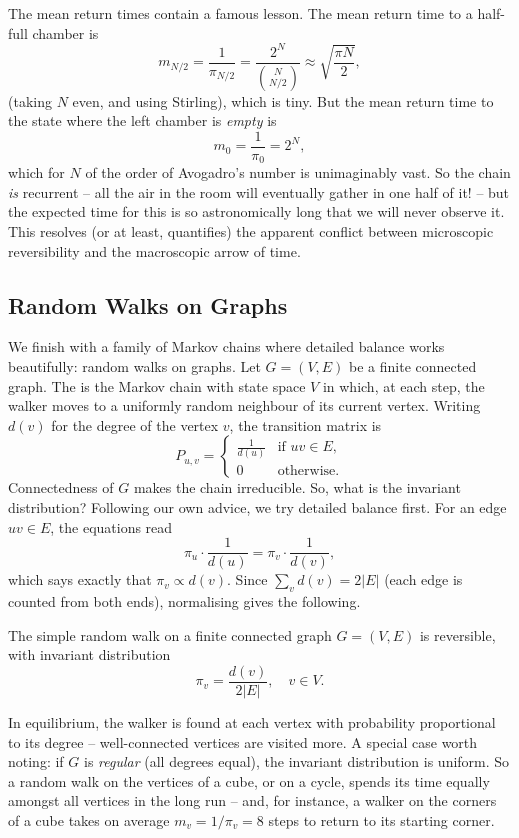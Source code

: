 \begin{example}
	The mean return times contain a famous lesson. The mean return time to a half-full chamber is
	$$
	m_{N/2} = \frac{1}{\pi_{N/2}} = \frac{2^N}{\binom{N}{N/2}} \approx \sqrt{\frac{\pi N}{2}},
	$$
	(taking $N$ even, and using Stirling), which is tiny. But the mean return time to the state where the left chamber is \emph{empty} is
	$$
	m_0 = \frac{1}{\pi_0} = 2^N,
	$$
	which for $N$ of the order of Avogadro's number is unimaginably vast. So the chain \emph{is} recurrent -- all the air in the room will eventually gather in one half of it! -- but the expected time for this is so astronomically long that we will never observe it. This resolves (or at least, quantifies) the apparent conflict between microscopic reversibility and the macroscopic arrow of time.
\end{example}

\subsection{Random Walks on Graphs}

We finish with a family of Markov chains where detailed balance works beautifully: random walks on graphs. Let $G = (V, E)$ be a finite connected graph. The  is the Markov chain with state space $V$ in which, at each step, the walker moves to a uniformly random neighbour of its current vertex. Writing $d(v)$ for the degree of the vertex $v$, the transition matrix is
$$
P_{u, v} = \begin{cases}
	\frac{1}{d(u)} &\mbox{if } uv \in E, \\
	0 &\mbox{otherwise}.
   \end{cases}
$$
Connectedness of $G$ makes the chain irreducible. So, what is the invariant distribution? Following our own advice, we try detailed balance first. For an edge $uv \in E$, the equations read
$$
\pi_u \cdot \frac{1}{d(u)} = \pi_v \cdot \frac{1}{d(v)},
$$
which says exactly that $\pi_v \propto d(v)$. Since $\sum_{v} d(v) = 2|E|$ (each edge is counted from both ends), normalising gives the following.

\begin{proposition}
	The simple random walk on a finite connected graph $G = (V, E)$ is reversible, with invariant distribution
	$$
	\pi_v = \frac{d(v)}{2|E|}, \quad v \in V.
	$$
\end{proposition}

In equilibrium, the walker is found at each vertex with probability proportional to its degree -- well-connected vertices are visited more. A special case worth noting: if $G$ is \emph{regular} (all degrees equal), the invariant distribution is uniform. So a random walk on the vertices of a cube, or on a cycle, spends its time equally amongst all vertices in the long run -- and, for instance, a walker on the corners of a cube takes on average $m_v = 1/\pi_v = 8$ steps to return to its starting corner.


